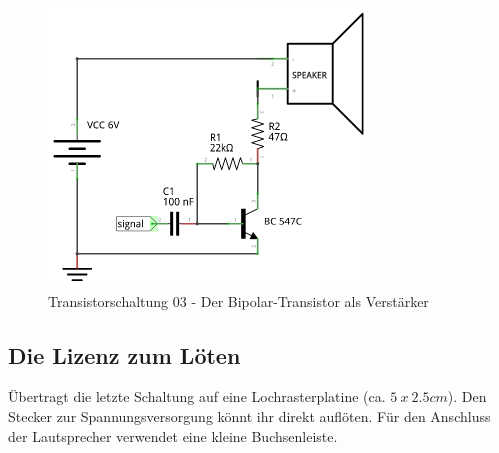 \begin{figure}[H]
	\centering
	\includegraphics[scale=1.6]{Transistor/Schaltungen/NPN_Verstaerker.pdf}
	\caption{Transistorschaltung 03 - Der Bipolar-Transistor als Verstärker}
	\label{s03}
\end{figure}


\subsection{Die Lizenz zum Löten}


Übertragt die letzte Schaltung auf eine Lochrasterplatine (ca. $5~x~2.5 cm$).
Den Stecker zur Spannungsversorgung könnt ihr direkt auflöten. Für den Anschluss
der Lautsprecher verwendet eine kleine Buchsenleiste.
